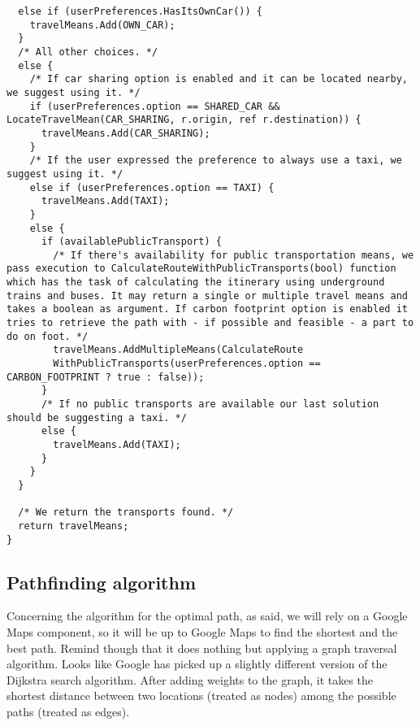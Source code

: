 \begin{tcolorbox}
\begin{verbatim}
  else if (userPreferences.HasItsOwnCar()) {
    travelMeans.Add(OWN_CAR);
  }
  /* All other choices. */
  else {
    /* If car sharing option is enabled and it can be located nearby, we suggest using it. */
    if (userPreferences.option == SHARED_CAR && LocateTravelMean(CAR_SHARING, r.origin, ref r.destination)) {
      travelMeans.Add(CAR_SHARING);
    }
    /* If the user expressed the preference to always use a taxi, we suggest using it. */
    else if (userPreferences.option == TAXI) {
      travelMeans.Add(TAXI);    
    }
    else {
      if (availablePublicTransport) {
        /* If there's availability for public transportation means, we pass execution to CalculateRouteWithPublicTransports(bool) function which has the task of calculating the itinerary using underground trains and buses. It may return a single or multiple travel means and takes a boolean as argument. If carbon footprint option is enabled it tries to retrieve the path with - if possible and feasible - a part to do on foot. */
        travelMeans.AddMultipleMeans(CalculateRoute
        WithPublicTransports(userPreferences.option == CARBON_FOOTPRINT ? true : false));
      }
      /* If no public transports are available our last solution should be suggesting a taxi. */
      else {
        travelMeans.Add(TAXI);
      }
    }
  }

  /* We return the transports found. */
  return travelMeans;
}

\end{verbatim}
\end{tcolorbox}
\subsection*{Pathfinding algorithm}
Concerning the algorithm for the optimal path, as said, we will rely on a Google Maps component, so it will be up to Google Maps to find the shortest and the best path. Remind though that it does nothing but applying a graph traversal algorithm. Looks like Google has picked up a slightly different version of the Dijkstra search algorithm\cite{maps}. After adding weights to the graph, it takes the shortest distance between two locations (treated as nodes) among the possible paths (treated as edges).


